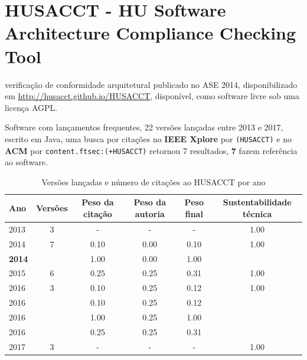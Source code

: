 \section{HUSACCT - HU Software Architecture Compliance Checking Tool}

verificação de conformidade arquitetural
publicado no ASE 2014,
disponibilizado em \url{http://husacct.github.io/HUSACCT},
disponível,
como software livre
sob uma licença AGPL.

Software com lançamentos frequentes,
22 versões lançadas
entre 2013 e 2017,
escrito em Java,
uma busca por citações no {\bf IEEE Xplore} por
\texttt{(HUSACCT)}
e no {\bf ACM} por
\texttt{content.ftsec:(+HUSACCT)}
retornou
7 resultados,
{\bf 7} fazem referência ao software.


\begin{table}[H]
\caption{Versões lançadas e número de citações ao HUSACCT por ano}
\centering
\begin{tabular}{| l | c | c | c | c | c |}
  \hline
  Ano & Versões & Peso da citação & Peso da autoria & Peso final & Sustentabilidade técnica \\
  \hline
        2013 & 3 & - & - & -
        &
          {\color{blue} 1.00}
        \\
\hline
            2014
          &
          7
          &
          0.10
          &
          0.00
          &
          0.10
          &
            {\color{blue} 1.00}
          \\
            {\bf 2014}
          &
          
          &
          1.00
          &
          0.00
          &
          1.00
          &
          \\
\hline
            2015
          &
          6
          &
          0.25
          &
          0.25
          &
          0.31
          &
            {\color{blue} 1.00}
          \\
\hline
            2016
          &
          3
          &
          0.10
          &
          0.25
          &
          0.12
          &
            {\color{blue} 1.00}
          \\
            2016
          &
          
          &
          0.10
          &
          0.25
          &
          0.12
          &
          \\
            2016
          &
          
          &
          1.00
          &
          0.25
          &
          1.00
          &
          \\
            2016
          &
          
          &
          0.25
          &
          0.25
          &
          0.31
          &
          \\
\hline
        2017 & 3 & - & - & -
        &
          {\color{blue} 1.00}
        \\
\hline
\end{tabular}
\end{table}

